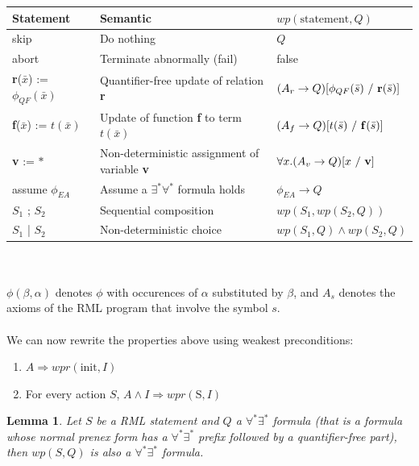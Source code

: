 \documentclass[11pt,a4paper,oldfontcommands]{memoir}
\newtheorem*{lemma}{Lemma}
\begin{document}
    \begin{tabular}{|l|l|l|}
        \hline
        Statement & Semantic & \( wp(\text{statement},Q) \) \\
        \hline
        skip & Do nothing & \(Q\) \\
        abort & Terminate abnormally (fail) & false \\
        \textbf{r}(\(\bar{x}\)) := \( \phi_{QF}(\bar{x}) \) & Quantifier-free update of relation \textbf{r} & \((A_r \rightarrow Q) [\phi_{QF}(\bar{s})\ /\ \text{\textbf{r}}(\bar{s})]\) \\
        \textbf{f}(\(\bar{x}\)) := \( t(\bar{x}) \) & Update of function \textbf{f} to term \( t(\bar{x}) \) & \((A_f \rightarrow Q) [t(\bar{s})\ /\ \text{\textbf{f}}(\bar{s})]\) \\
        \textbf{v} := \( * \) & Non-deterministic assignment of variable \textbf{v} & \(\forall x. (A_v \rightarrow Q) [x\ /\ \text{\textbf{v}}]\)\\
        assume \( \phi_{EA} \) & Assume a \( \exists^*\forall^* \) formula holds & \( \phi_{EA} \rightarrow Q \) \\
        \( S_1 \) ; \( S_2 \) & Sequential composition & \( wp(S_1, wp(S_2, Q)) \) \\
        \( S_1 \) | \( S_2 \) & Non-deterministic choice & \( wp(S_1, Q) \land wp(S_2, Q) \) \\
        \hline
    \end{tabular}\\ \\
    \( \phi(\beta,\alpha) \) denotes \(\phi\) with occurences of \(\alpha\) substituted by \(\beta\), and \(A_s\) denotes the axioms of the RML program
    that involve the symbol \(s\).\\
    \\
    We can now rewrite the properties above using weakest preconditions:
    \begin{enumerate}
        \item \(A \Rightarrow wpr(\text{init},I)\)
        \item For every action \(S\), \(A \land I \Rightarrow wpr(\text{S},I)\)
    \end{enumerate}

    \begin{lemma}
        Let \(S\) be a RML statement and \(Q\) a \(\forall^*\exists^*\) formula (that is a formula whose normal prenex form has a \(\forall^*\exists^*\) prefix followed by a quantifier-free part), then \(wp(S,Q)\) is also a \(\forall^*\exists^*\) formula.
    \end{lemma}
\end{document}
